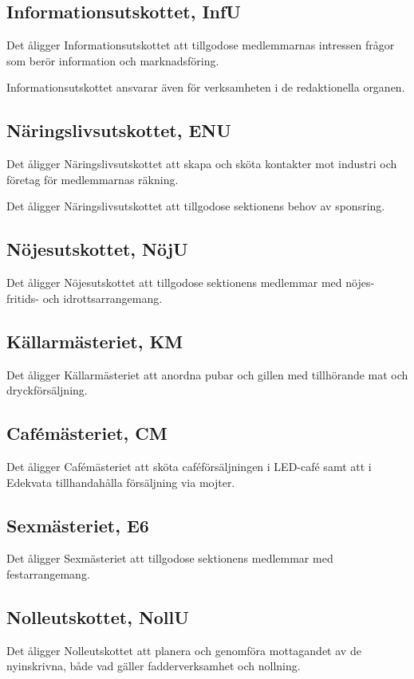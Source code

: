 \documentclass[10pt]{article}
\begin{document}
\subsection{Informationsutskottet, InfU}
Det åligger Informationsutskottet att tillgodose medlemmarnas
intressen frågor som berör information och marknadsföring.

Informationsutskottet ansvarar även för verksamheten i de redaktionella
organen.

\subsection{Näringslivsutskottet, ENU}
Det åligger Näringslivsutskottet att skapa och
sköta kontakter mot industri och företag för medlemmarnas räkning.

Det åligger Näringslivsutskottet att tillgodose
sektionens behov av sponsring.

\subsection{Nöjesutskottet, NöjU}
Det åligger Nöjesutskottet att tillgodose sektionens medlemmar med
nöjes- fritids- och idrottsarrangemang.

\subsection{Källarmästeriet, KM}
Det åligger Källarmästeriet att anordna pubar och gillen med tillhörande mat
och dryckförsäljning.

\subsection{Cafémästeriet, CM}
Det åligger Cafémästeriet att sköta caféförsäljningen i LED-café samt att i Edekvata tillhandahålla försäljning via mojter.

\subsection{Sexmästeriet, E6}
Det åligger Sexmästeriet att tillgodose sektionens medlemmar med
festarrangemang.

\subsection{Nolleutskottet, NollU}
Det åligger Nolleutskottet att planera och genomföra mottagandet av
de nyinskrivna, både vad gäller fadderverksamhet och nollning.
\end{document}
